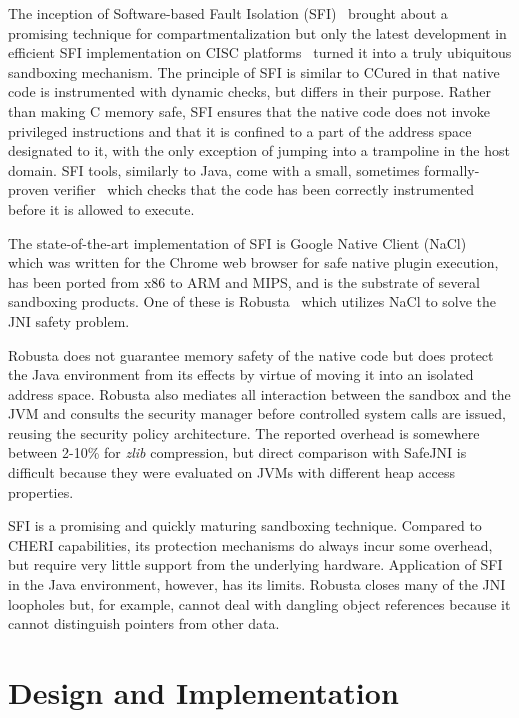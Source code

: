 \documentclass[a4paper,12pt,twoside,openright]{report}
\begin{document}
The inception of Software-based Fault Isolation (SFI)~\cite{Wahbe:1993:ESF:168619.168635} brought about a promising technique for compartmentalization but only the latest development in efficient SFI implementation on CISC platforms~\cite{McCamant:2006:ESC:1267336.1267351} turned it into a truly ubiquitous sandboxing mechanism. The principle of SFI is similar to CCured in that native code is instrumented with dynamic checks, but differs in their purpose. Rather than making C memory safe, SFI ensures that the native code does not invoke privileged instructions and that it is confined to a part of the address space designated to it, with the only exception of jumping into a trampoline in the host domain. SFI tools, similarly to Java, come with a small, sometimes formally-proven verifier~\cite{Morrisett:2012:RBF:2254064.2254111} which checks that the code has been correctly instrumented before it is allowed to execute.

The state-of-the-art implementation of SFI is Google Native Client (NaCl)~\cite{5207638} which was written for the Chrome web browser for safe native plugin execution, has been ported from x86 to ARM and MIPS, and is the substrate of several sandboxing products. One of these is Robusta~\cite{siefers2010robusta} which utilizes NaCl to solve the JNI safety problem. 

Robusta does not guarantee memory safety of the native code but does protect the Java environment from its effects by virtue of moving it into an isolated address space. Robusta also mediates all interaction between the sandbox and the JVM and consults the security manager before controlled system calls are issued, reusing the security policy architecture. The reported overhead is somewhere between 2-10\% for \emph{zlib} compression, but direct comparison with SafeJNI is difficult because they were evaluated on JVMs with different heap access properties.

\label{sec:Robusta}
SFI is a promising and quickly maturing sandboxing technique. Compared to CHERI capabilities, its protection mechanisms do always incur some overhead, but require very little support from the underlying hardware. Application of SFI in the Java environment, however, has its limits. Robusta closes many of the JNI loopholes but, for example, cannot deal with dangling object references because it cannot distinguish pointers from other data.

\chapter{Design and Implementation} 
\end{document}
